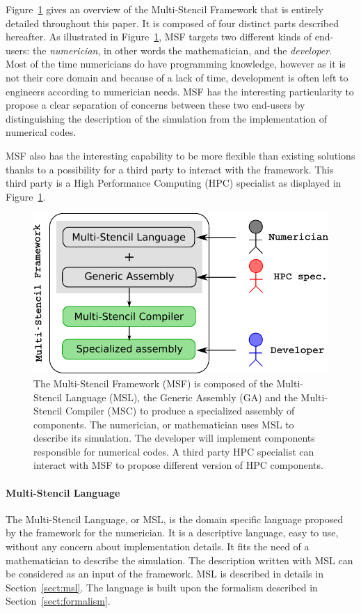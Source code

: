 Figure~\ref{fig:msf} gives an overview of the Multi-Stencil Framework that is entirely detailed throughout this paper. It is composed of four distinct parts described hereafter.
As illustrated in Figure~\ref{fig:msf}, MSF targets two different kinds of end-users: the \emph{numerician}, in other words the mathematician, and the \emph{developer}. Most of the time numericians do have programming knowledge, however as it is not their core domain and because of a lack of time, development is often left to engineers according to numerician needs. MSF has the interesting particularity to propose a clear separation of concerns between these two end-users by distinguishing the description of the simulation from the implementation of numerical codes.

MSF also has the interesting capability to be more flexible than existing solutions thanks to a possibility for a third party to interact with the framework. This third party is a High Performance Computing (HPC) specialist as displayed in Figure~\ref{fig:msf}.

\begin{figure}[t]
\begin{center}
  \includegraphics[width=.6\textwidth]{./images/msf.pdf}
  \caption{The Multi-Stencil Framework (MSF) is composed of the Multi-Stencil Language (MSL), the Generic Assembly (GA) and the Multi-Stencil Compiler (MSC) to produce a specialized assembly of components. The numerician, or mathematician uses MSL to describe its simulation. The developer will implement components responsible for numerical codes. A third party HPC specialist can interact with MSF to propose different version of HPC components.}
  \label{fig:msf}
\end{center}
\end{figure}

\paragraph{\textbf{Multi-Stencil Language}}
The Multi-Stencil Language, or MSL, is the domain specific language proposed by the framework for the numerician. It is a descriptive language, easy to use, without any concern about implementation details.
It fits the need of a mathematician to describe the simulation. The description written with MSL can be considered as an input of the framework. MSL is described in details in Section~\ref{sect:msl}. The language is built upon the formalism described in Section~\ref{sect:formalism}.

